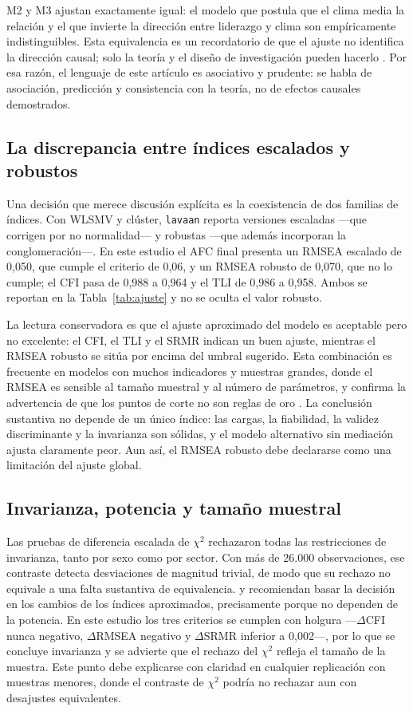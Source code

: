 \documentclass[11pt,a4paper]{article}
\newcommand{\chisq}{$\chi^2$}
\begin{document}
M2 y M3 ajustan exactamente igual: el modelo que postula que el clima media la relación y el
que invierte la dirección entre liderazgo y clima son empíricamente indistinguibles. Esta
equivalencia es un recordatorio de que el ajuste no identifica la dirección causal; solo la
teoría y el diseño de investigación pueden hacerlo \citep{maccallum1993}. Por esa razón, el
lenguaje de este artículo es asociativo y prudente: se habla de asociación, predicción y
consistencia con la teoría, no de efectos causales demostrados.

\subsection{La discrepancia entre índices escalados y robustos}

Una decisión que merece discusión explícita es la coexistencia de dos familias de índices.
Con WLSMV y clúster, \texttt{lavaan} reporta versiones escaladas —que corrigen por no
normalidad— y robustas —que además incorporan la conglomeración—. En este estudio el AFC
final presenta un RMSEA escalado de 0,050, que cumple el criterio de 0,06, y un RMSEA robusto
de 0,070, que no lo cumple; el CFI pasa de 0,988 a 0,964 y el TLI de 0,986 a 0,958. Ambos se
reportan en la Tabla~\ref{tab:ajuste} y no se oculta el valor robusto.

La lectura conservadora es que el ajuste aproximado del modelo es aceptable pero no
excelente: el CFI, el TLI y el SRMR indican un buen ajuste, mientras el RMSEA robusto se
sitúa por encima del umbral sugerido. Esta combinación es frecuente en modelos con muchos
indicadores y muestras grandes, donde el RMSEA es sensible al tamaño muestral y al número de
parámetros, y confirma la advertencia de que los puntos de corte no son reglas de oro
\citep{marsh2004}. La conclusión sustantiva no depende de un único índice: las cargas, la
fiabilidad, la validez discriminante y la invarianza son sólidas, y el modelo alternativo sin
mediación ajusta claramente peor. Aun así, el RMSEA robusto debe declararse como una
limitación del ajuste global.

\subsection{Invarianza, potencia y tamaño muestral}

Las pruebas de diferencia escalada de \chisq{} rechazaron todas las restricciones de
invarianza, tanto por sexo como por sector. Con más de 26.000 observaciones, ese contraste
detecta desviaciones de magnitud trivial, de modo que su rechazo no equivale a una falta
sustantiva de equivalencia. \citet{cheung2002} y \citet{chen2007} recomiendan basar la
decisión en los cambios de los índices aproximados, precisamente porque no dependen de la
potencia. En este estudio los tres criterios se cumplen con holgura —$\Delta$CFI nunca
negativo, $\Delta$RMSEA negativo y $\Delta$SRMR inferior a 0,002—, por lo que se concluye
invarianza y se advierte que el rechazo del \chisq{} refleja el tamaño de la muestra. Este
punto debe explicarse con claridad en cualquier replicación con muestras menores, donde el
contraste de \chisq{} podría no rechazar aun con desajustes equivalentes.
\end{document}
